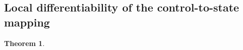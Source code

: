 \documentclass[11pt,reqno]{amsart}%
\newtheorem{theorem}{Theorem}[section]
\numberwithin{equation}{section}
\begin{document}
{%












 \subsection{Local differentiability of the control-to-state mapping}

\begin{theorem}\label{v9}


\end{theorem}}
\end{document}
